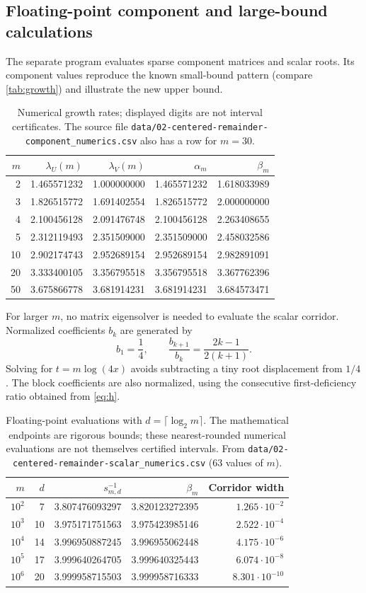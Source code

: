 \documentclass[11pt,a4paper]{article}
\theoremstyle{definition}\newaliascnt{definition}{theorem}
\theoremstyle{remark}\newaliascnt{remark}{theorem}
\begin{document}
\subsection{Floating-point component and large-bound calculations}
The separate program  evaluates
sparse component matrices and scalar roots. Its component values reproduce
the known small-bound pattern (compare \cref{tab:growth}) and illustrate the
new upper bound.
\begin{table}[htbp]
\centering\small
\caption{Numerical growth rates; displayed digits are not interval
certificates. The source file
\texttt{data/02-centered-remainder-component\_numerics.csv} also has a row
for $m=30$.}
\label{crem:tab:components-numerical}
\begin{tabular}{rrrrr}
\toprule
$m$ & $\lambda_U(m)$ & $\lambda_V(m)$ & $\alpha_m$ & $\beta_m$\\
\midrule
2 &1.465571232&1.000000000&1.465571232&1.618033989\\
3 &1.826515772&1.691402554&1.826515772&2.000000000\\
4 &2.100456128&2.091476748&2.100456128&2.263408655\\
5 &2.312119493&2.351509000&2.351509000&2.458032586\\
10&2.902174743&2.952689154&2.952689154&2.982891091\\
20&3.333400105&3.356795518&3.356795518&3.367762396\\
50&3.675866778&3.681914231&3.681914231&3.684573471\\
\bottomrule
\end{tabular}
\end{table}
For larger $m$, no matrix eigensolver is needed to evaluate the scalar
corridor. Normalized coefficients $b_k$ are generated by
\[
 b_1=\frac14,\qquad \frac{b_{k+1}}{b_k}=\frac{2k-1}{2(k+1)}.
\]
Solving for $t=m\log(4x)$ avoids subtracting a tiny root displacement from
$1/4$. The block coefficients are also normalized, using the consecutive
first-deficiency ratio obtained from \eqref{eq:h}.
\begin{table}[htbp]
\centering\small
\caption{Floating-point evaluations with $d=\lceil\log_2m\rceil$. The
mathematical endpoints are rigorous bounds; these nearest-rounded numerical
evaluations are not themselves certified intervals. From
\texttt{data/02-centered-remainder-scalar\_numerics.csv} (63 values of $m$).}
\label{crem:tab:large-m}
\begin{tabular}{rrrrr}
\toprule
$m$ &$d$ &$s_{m,d}^{-1}$ &$\beta_m$ & Corridor width\\
\midrule
$10^2$&7 &3.807476093297&3.820123272395&$1.265\cdot10^{-2}$\\
$10^3$&10&3.975171751563&3.975423985146&$2.522\cdot10^{-4}$\\
$10^4$&14&3.996950887245&3.996955062448&$4.175\cdot10^{-6}$\\
$10^5$&17&3.999640264705&3.999640325443&$6.074\cdot10^{-8}$\\
$10^6$&20&3.999958715503&3.999958716333&$8.301\cdot10^{-10}$\\
\bottomrule
\end{tabular}
\end{table}
\end{document}
